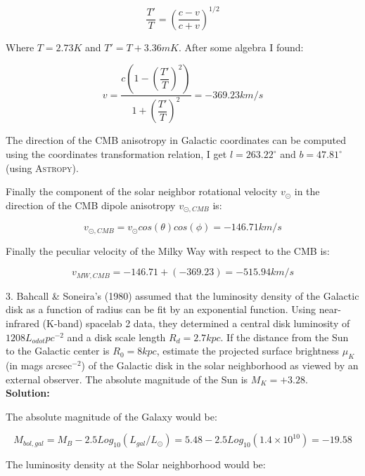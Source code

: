 \documentclass[14pt]{article}
\begin{document}
\begin{equation}
\dfrac{T'}{T} = \left( \dfrac{c-v}{c+v}\right)^{1/2}
\end{equation}

Where $T=2.73K$ and $T'=T+3.36mK$. After some algebra I found:

\begin{equation}
v = \dfrac{c\left (1 - \left (\dfrac{T'}{T}\right )^2 \right )}
{1 + \left (\dfrac{T'}{T}\right )^2} = -369.23 km/s
\end{equation}

The direction of the CMB anisotropy in Galactic coordinates can be
computed using the coordinates transformation relation, I get
$l=263.22^{\circ}$ and $b=47.81^{\circ}$ (using \textsc{Astropy}).

Finally the component of the solar neighbor rotational velocity
$v_{\odot}$ in the
direction of the CMB dipole anisotropy $v_{\odot, CMB}$ is:

\begin{equation}
v_{\odot, CMB} = v_{\odot} cos(\theta)cos(\phi) = -146.71 km/s
\end{equation}

Finally the peculiar velocity of the Milky Way with respect to the
CMB is:

\begin{equation}
v_{MW, CMB} = -146.71+(-369.23) = -515.94 km/s
\end{equation}

3. Bahcall \& Soneira's (1980) assumed that the luminosity density of
the Galactic disk as a function of radius can be fit by an exponential
function. Using near-infrared (K-band) spacelab 2 data, they
determined a central disk luminosity of $1208  L_{odot} pc^{-2}$ and a
disk scale length $R_d=2.7 kpc$. If the distance from the Sun to the
Galactic center is $R_0=8kpc$, estimate the projected surface
brightness $\mu_K$ (in mags arcsec$^{-2}$) of the Galactic disk in
the solar neighborhood as viewed by an external observer. The absolute
magnitude of the Sun is $M_K=+3.28$.\\

\textbf{Solution:}

The absolute magnitude of the Galaxy would be:

\begin{equation}
M_{bol, gal} = M_B - 2.5Log_{10}(L_{gal}/L_{\odot}) = 5.48 -
2.5Log_{10}(1.4\times 10^{10}) = -19.58
\end{equation}

The luminosity density at the Solar neighborhood would be:
\end{document}
